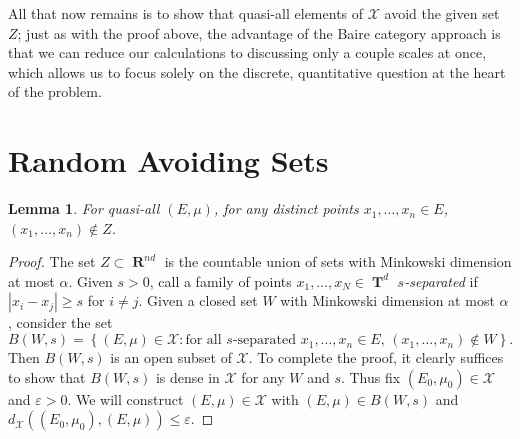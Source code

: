 \documentclass[12pt,reqno]{article}
\numberwithin{equation}{section}
\DeclareMathOperator{\RR}{\mathbf{R}}
\DeclareMathOperator{\TT}{\mathbf{T}}
\newtheorem{lemma}[theorem]{Lemma}
\begin{document}
All that now remains is to show that quasi-all elements of $\mathcal{X}$ avoid the given set $Z$; just as with the proof above, the advantage of the Baire category approach is that we can reduce our calculations to discussing only a couple scales at once, which allows us to focus solely on the discrete, quantitative question at the heart of the problem.

\section{Random Avoiding Sets} 

\begin{lemma}
    For quasi-all $(E,\mu)$, for any distinct points $x_1, \dots, x_n \in E$, $(x_1, \dots, x_n) \not \in Z$.
\end{lemma}
\begin{proof}
    The set $Z \subset \RR^{nd}$ is the countable union of sets with Minkowski dimension at most $\alpha$. Given $s > 0$, call a family of points $x_1, \dots, x_N \in \TT^d$ \emph{$s$-separated} if $|x_i - x_j| \geq s$ for $i \neq j$. Given a closed set $W$ with Minkowski dimension at most $\alpha$, consider the set
    \[ B(W,s) = \left\{ (E,\mu) \in \mathcal{X} : \text{for all $s$-separated $x_1, \dots, x_n \in E$, $(x_1, \dots, x_n) \not \in W$} \right\}. \]
    Then $B(W,s)$ is an open subset of $\mathcal{X}$. To complete the proof, it clearly suffices to show that $B(W,s)$ is dense in $\mathcal{X}$ for any $W$ and $s$. Thus fix $(E_0,\mu_0) \in \mathcal{X}$ and $\varepsilon > 0$. We will construct $(E,\mu) \in \mathcal{X}$ with $(E,\mu) \in B(W,s)$ and $d_{\mathcal{X}}((E_0,\mu_0),(E,\mu)) \leq \varepsilon$.


\end{proof}
\end{document}
